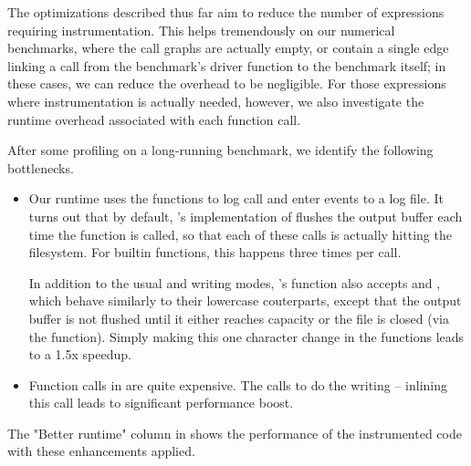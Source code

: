 The optimizations described thus far aim to reduce the number of expressions
requiring instrumentation. This helps tremendously on our numerical benchmarks,
where the call graphs are actually empty, or contain a single edge linking a
call from the benchmark's driver function to the benchmark itself; in these
cases, we can reduce the overhead to be negligible. For those expressions
where instrumentation is actually needed, however, we also investigate the
runtime overhead associated with each function call.

After some profiling on a long-running benchmark, we identify the following
bottlenecks.

\begin{itemize}

  \item Our runtime uses the  functions to log call and enter
    events to a log file. It turns out that by default, \matlab's
    implementation of  flushes the output buffer each time the
    function is called, so that each of these calls is actually hitting the
    filesystem. For builtin functions, this happens three times per call.

    In addition to the usual  and  writing modes,
    \matlab's  function also accepts  and ,
    which behave similarly to their lowercase couterparts, except that the
    output buffer is not flushed until it either reaches capacity or the file
    is closed (via the  function). Simply making this one
    character change in the  functions leads to
    a 1.5x speedup.

  \item Function calls in \matlab are quite expensive. The
     calls 
    to do the writing -- inlining this call leads to significant performance
    boost.

\end{itemize}

The "Better runtime" column in  shows the
performance of the instrumented code with these enhancements applied.
